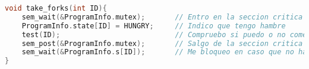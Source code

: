 \begin{lstlisting}[style=CodeStyle, caption={Función para que un filosofo tome sus tenedores}, label={lst:FuncionTakeForks}, language=C]
void take_forks(int ID){
    sem_wait(&ProgramInfo.mutex);       // Entro en la seccion critica
    ProgramInfo.state[ID] = HUNGRY;     // Indico que tengo hambre
    test(ID);                           // Compruebo si puedo o no comer
    sem_post(&ProgramInfo.mutex);       // Salgo de la seccion critica
    sem_wait(&ProgramInfo.s[ID]);       // Me bloqueo en caso que no haya podido tomar los tenedores
}
\end{lstlisting}